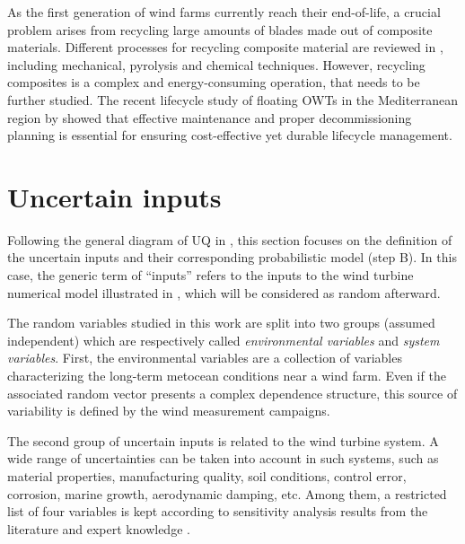As the first generation of wind farms currently reach their end-of-life, a crucial problem arises from recycling large amounts of blades made out of composite materials. 
Different processes for recycling composite material are reviewed in \citet{jensen_2018_blade_recycling}, including mechanical, pyrolysis and chemical techniques. 
However, recycling composites is a complex and energy-consuming operation, that needs to be further studied. 
The recent lifecycle study of floating OWTs in the Mediterranean region by \citet{pulselli_2022_FOWT_lifecycle} showed that effective maintenance and 
proper decommissioning planning is essential for ensuring cost-effective yet durable lifecycle management.  




\section{Uncertain inputs} \label{sec:owt_uncertainties}

Following the general diagram of UQ in , this section focuses on the definition of the uncertain inputs and their corresponding probabilistic model (step B). 
In this case, the generic term of ``inputs'' refers to the inputs to the wind turbine numerical model illustrated in , which will be considered as random afterward. 

The random variables studied in this work are split into two groups (assumed independent) which are respectively called \textit{environmental variables} and \textit{system variables}. 
First, the environmental variables are a collection of variables characterizing the long-term metocean conditions near a wind farm.
Even if the associated random vector presents a complex dependence structure, this source of variability is defined by the wind measurement campaigns. 

The second group of uncertain inputs is related to the wind turbine system. 
A wide range of uncertainties can be taken into account in such systems, such as material properties, manufacturing quality, soil conditions, control error, corrosion, marine growth, aerodynamic damping, etc.  
Among them, a restricted list of four variables is kept according to sensitivity analysis results from the literature and expert knowledge \citep{dimitrov_kelly_2018,teixeira_2019,verlade_kramhoft_2019,petrovska_2022}. 

